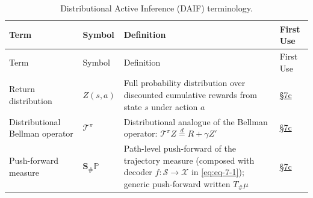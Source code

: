 \documentclass[
]{article}
\begin{document}
\begin{longtable}[]{@{}
  >{\raggedright\arraybackslash}p{}
  >{\centering\arraybackslash}p{}
  >{\raggedright\arraybackslash}p{}
  >{\centering\arraybackslash}p{}@{}}
\caption{Distributional Active Inference (DAIF)
terminology.}\label{tbl:not-daif}\tabularnewline
\toprule\noalign{}
\begin{minipage}[b]{\linewidth}\raggedright
Term
\end{minipage} & \begin{minipage}[b]{\linewidth}\centering
Symbol
\end{minipage} & \begin{minipage}[b]{\linewidth}\raggedright
Definition
\end{minipage} & \begin{minipage}[b]{\linewidth}\centering
First Use
\end{minipage} \\
\midrule\noalign{}
\endfirsthead
\toprule\noalign{}
\begin{minipage}[b]{\linewidth}\raggedright
Term
\end{minipage} & \begin{minipage}[b]{\linewidth}\centering
Symbol
\end{minipage} & \begin{minipage}[b]{\linewidth}\raggedright
Definition
\end{minipage} & \begin{minipage}[b]{\linewidth}\centering
First Use
\end{minipage} \\
\midrule\noalign{}
\endhead
\bottomrule\noalign{}
\endlastfoot
Return distribution & \(Z(s,a)\) & Full probability distribution over
discounted cumulative rewards from state \(s\) under action \(a\) &
\href{07c_daif_results.md\#sec:daif-results}{§7c} \\
Distributional Bellman operator & \(\mathcal{T}^{\pi}\) & Distributional
analogue of the Bellman operator:
\(\mathcal{T}^{\pi}Z \stackrel{d}{=} R + \gamma Z'\) &
\href{07c_daif_results.md\#sec:daif-results}{§7c} \\
Push-forward measure & \(\mathbf{S}_{\#}\mathbb{P}\) & Path-level
push-forward of the trajectory measure (composed with decoder
\(f: \mathcal{S} \to \mathcal{X}\) in \autoref{eq:eq-7-1}); generic
push-forward written \(T_{\#}\mu\) &
\href{07c_daif_results.md\#sec:daif-results}{§7c} \\

\end{longtable}
\end{document}
